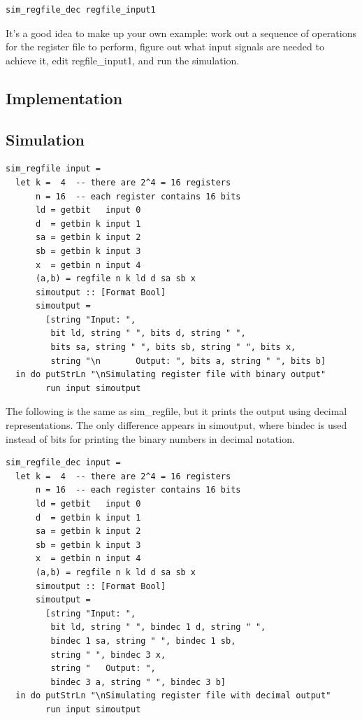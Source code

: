 \documentclass[a4paper,openany,fleqn]{book}
\begin{document}
\begin{verbatim}
sim_regfile_dec regfile_input1
\end{verbatim}

It's a good idea to make up your own example: work out a sequence of
operations for the register file to perform, figure out what input
signals are needed to achieve it, edit regfile\_input1, and run the
simulation.

\subsection{Implementation}
\label{sec:reg-file-implementation}

\subsection{Simulation}
\label{sec:reg-file-sim}

\begin{verbatim}
sim_regfile input =
  let k =  4  -- there are 2^4 = 16 registers
      n = 16  -- each register contains 16 bits
      ld = getbit   input 0
      d  = getbin k input 1
      sa = getbin k input 2
      sb = getbin k input 3
      x  = getbin n input 4
      (a,b) = regfile n k ld d sa sb x
      simoutput :: [Format Bool]
      simoutput =
        [string "Input: ",
         bit ld, string " ", bits d, string " ",
         bits sa, string " ", bits sb, string " ", bits x,
         string "\n       Output: ", bits a, string " ", bits b]
  in do putStrLn "\nSimulating register file with binary output"
        run input simoutput
\end{verbatim}

The following is the same as sim\_regfile, but it prints the output
using decimal representations.  The only difference appears in
simoutput, where bindec is used instead of bits for printing the binary
numbers in decimal notation.

\begin{verbatim}
sim_regfile_dec input =
  let k =  4  -- there are 2^4 = 16 registers
      n = 16  -- each register contains 16 bits
      ld = getbit   input 0
      d  = getbin k input 1
      sa = getbin k input 2
      sb = getbin k input 3
      x  = getbin n input 4
      (a,b) = regfile n k ld d sa sb x
      simoutput :: [Format Bool]
      simoutput =
        [string "Input: ",
         bit ld, string " ", bindec 1 d, string " ",
         bindec 1 sa, string " ", bindec 1 sb,
         string " ", bindec 3 x,
         string "   Output: ",
         bindec 3 a, string " ", bindec 3 b]
  in do putStrLn "\nSimulating register file with decimal output"
        run input simoutput
\end{verbatim}
\end{document}
